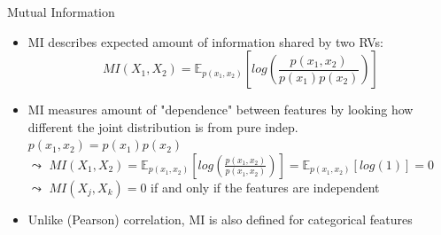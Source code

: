 \documentclass[10pt,compress,t,notes=noshow, xcolor=table]{beamer}
\begin{document}
\begin{frame}{Mutual Information}
    \begin{itemize}
        \item MI describes expected amount of information shared by two RVs:%
        $$MI(X_1, X_2 ) =  \mathbb{E}_{p(x_1, x_2)} \left[ log\left(\frac{p(x_1, x_2)}{p(x_1) p(x_2)} \right) \right] $$
        \item MI measures amount of "dependence" between features by looking how different the joint distribution is from pure indep. $p(x_1, x_2) = p(x_1) p(x_2)$\\
        $\leadsto$ $MI(X_1, X_2) = \mathbb{E}_{p(x_1, x_2)} \left[ log\left(\frac{p(x_1, x_2)}{p(x_1, x_2)} \right) \right] = \mathbb{E}_{p(x_1, x_2)} \left[ log(1) \right] = 0$\\
        $\leadsto$  $MI(X_j, X_k) = 0$ if and only if the features are independent
        \item Unlike (Pearson) correlation, MI is also defined for categorical features %
    \end{itemize}
\end{frame}
\end{document}
